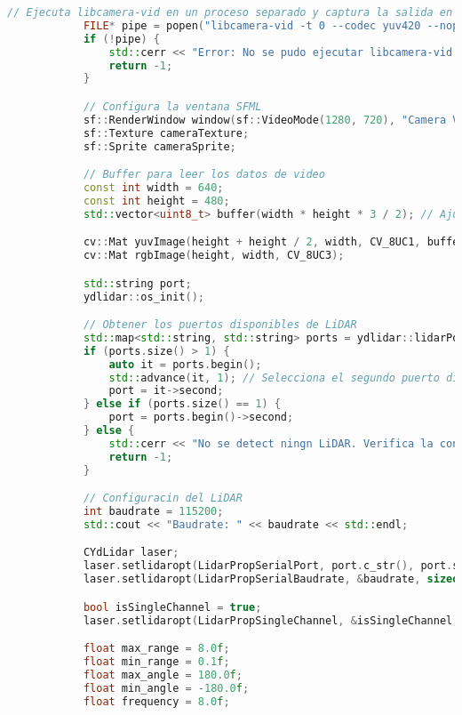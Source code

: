 \begin{lstlisting}[language={C++}, caption={Primera versi\'on del c\'odigo del sistema de control del robot}, label={Script}]
            // Ejecuta libcamera-vid en un proceso separado y captura la salida en YUV, sin previsualizacn
            FILE* pipe = popen("libcamera-vid -t 0 --codec yuv420 --nopreview -o -", "r");
            if (!pipe) {
                std::cerr << "Error: No se pudo ejecutar libcamera-vid." << std::endl;
                return -1;
            }

            // Configura la ventana SFML
            sf::RenderWindow window(sf::VideoMode(1280, 720), "Camera Visualization with LiDAR");
            sf::Texture cameraTexture;
            sf::Sprite cameraSprite;

            // Buffer para leer los datos de video
            const int width = 640;
            const int height = 480;
            std::vector<uint8_t> buffer(width * height * 3 / 2); // Ajusta el tamao del buffer para YUV420

            cv::Mat yuvImage(height + height / 2, width, CV_8UC1, buffer.data());
            cv::Mat rgbImage(height, width, CV_8UC3);

            std::string port;
            ydlidar::os_init();

            // Obtener los puertos disponibles de LiDAR
            std::map<std::string, std::string> ports = ydlidar::lidarPortList();
            if (ports.size() > 1) {
                auto it = ports.begin();
                std::advance(it, 1); // Selecciona el segundo puerto disponible
                port = it->second;
            } else if (ports.size() == 1) {
                port = ports.begin()->second;
            } else {
                std::cerr << "No se detect ningn LiDAR. Verifica la conexin." << std::endl;
                return -1;
            }

            // Configuracin del LiDAR
            int baudrate = 115200;
            std::cout << "Baudrate: " << baudrate << std::endl;

            CYdLidar laser;
            laser.setlidaropt(LidarPropSerialPort, port.c_str(), port.size());
            laser.setlidaropt(LidarPropSerialBaudrate, &baudrate, sizeof(int));

            bool isSingleChannel = true;
            laser.setlidaropt(LidarPropSingleChannel, &isSingleChannel, sizeof(bool));

            float max_range = 8.0f;
            float min_range = 0.1f;
            float max_angle = 180.0f;
            float min_angle = -180.0f;
            float frequency = 8.0f;


\end{lstlisting}
